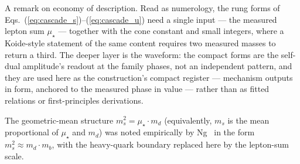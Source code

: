 \documentclass[11pt]{article}
\begin{document}
A remark on economy of description. Read as numerology, the rung forms of
Eqs.~(\ref{eq:cascade_s})--(\ref{eq:cascade_u}) need a single input --- the
measured lepton sum $\mu_\star$ --- together with the cone constant and small
integers, where a Koide-style statement of the same content requires two
measured masses to return a third. The deeper layer is the waveform: the
compact forms are the self-dual amplitude's readout at the family phases, not
an independent pattern, and they are used here as the construction's
compact register --- mechanism outputs in form, anchored to the measured
phase in value --- rather than as fitted relations or first-principles
derivations.

The geometric-mean structure $m_s^2 = \mu_\star\cdot m_d$ (equivalently,
$m_s$ is the mean proportional of $\mu_\star$ and $m_d$) was noted empirically
by Ng~\cite{Ng} in the form $m_s^2 \approx m_d\cdot m_b$, with the heavy-quark
boundary replaced here by the lepton-sum scale.
\end{document}
